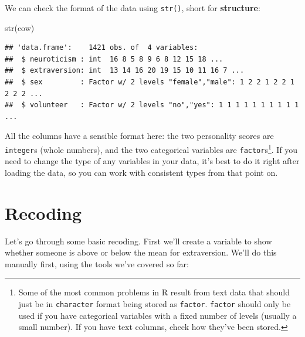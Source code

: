 \documentclass[
]{book}
\newenvironment{Shaded}{\begin{snugshade}}{\end{snugshade}}
\newcommand{\AttributeTok}[1]{\textcolor[rgb]{0.77,0.63,0.00}{#1}}
\newcommand{\CommentTok}[1]{\textcolor[rgb]{0.56,0.35,0.01}{\textit{#1}}}
\newcommand{\FunctionTok}[1]{\textcolor[rgb]{0.00,0.00,0.00}{#1}}
\newcommand{\NormalTok}[1]{#1}
\newcommand{\OtherTok}[1]{\textcolor[rgb]{0.56,0.35,0.01}{#1}}
\newcommand{\SpecialCharTok}[1]{\textcolor[rgb]{0.00,0.00,0.00}{#1}}
\newcommand{\StringTok}[1]{\textcolor[rgb]{0.31,0.60,0.02}{#1}}
\begin{document}
We can check the format of the data using \texttt{str()}, short for
\textbf{structure}:

\begin{Shaded}
\begin{Highlighting}[]
\FunctionTok{str}\NormalTok{(cow)}
\end{Highlighting}
\end{Shaded}

\begin{verbatim}
## 'data.frame':    1421 obs. of  4 variables:
##  $ neuroticism : int  16 8 5 8 9 6 8 12 15 18 ...
##  $ extraversion: int  13 14 16 20 19 15 10 11 16 7 ...
##  $ sex         : Factor w/ 2 levels "female","male": 1 2 2 1 2 2 1 2 2 2 ...
##  $ volunteer   : Factor w/ 2 levels "no","yes": 1 1 1 1 1 1 1 1 1 1 ...
\end{verbatim}

All the columns have a sensible format here: the two personality
scores are \texttt{integer}s (whole numbers), and the two categorical
variables are \texttt{factor}s\footnote{Some of the most common problems in R result
  from text data that should just be in \texttt{character} format being
  stored as \texttt{factor}. \texttt{factor} should only be used if you
  have categorical variables with a fixed number of levels (usually
  a small number). If you have text columns, check how they've
  been stored.}. If you need to change
the type of any variables in your data, it's best to do it
right after loading the data, so you can work with consistent
types from that point on.

\hypertarget{recoding}{%
\section{Recoding}\label{recoding}}

Let's go through some basic recoding. First we'll create a variable
to show whether someone is above or below the mean for extraversion.
We'll do this manually first, using the tools we've covered so far:

\begin{Shaded}
\end{Shaded}
\end{document}
